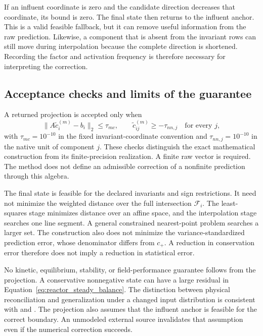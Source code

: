 If an influent coordinate is zero and the candidate direction decreases that coordinate, its bound is zero. The final state then returns to the influent anchor. This is a valid feasible fallback, but it can remove useful information from the raw prediction. Likewise, a component that is absent from the invariant rows can still move during interpolation because the complete direction is shortened. Recording the factor and activation frequency is therefore necessary for interpreting the correction.

\subsection{Acceptance checks and limits of the guarantee}

A returned projection is accepted only when
\begin{equation}
\|A\tilde c_i^{(m)}-b_i\|_2\leq\tau_{mc},\qquad
\tilde c_{ij}^{(m)}\geq-\tau_{nn,j}\quad\text{for every }j,
\label{eq:projection_numerical_acceptance}
\end{equation}
with $\tau_{mc}=10^{-10}$ in the fixed invariant-coordinate convention and $\tau_{nn,j}=10^{-10}$ in the native unit of component $j$. These checks distinguish the exact mathematical construction from its finite-precision realization. A finite raw vector is required. The method does not define an admissible correction of a nonfinite prediction through this algebra.

The final state is feasible for the declared invariants and sign restrictions. It need not minimize the weighted distance over the full intersection $\mathcal{F}_i$. The least-squares stage minimizes distance over an affine space, and the interpolation stage searches one line segment. A general constrained nearest-point problem searches a larger set. The construction also does not minimize the variance-standardized prediction error, whose denominator differs from $c_+$. A reduction in conservation error therefore does not imply a reduction in statistical error.

No kinetic, equilibrium, stability, or field-performance guarantee follows from the projection. A conservative nonnegative state can have a large residual in Equation~\eqref{eq:reactor_steady_balance}. The distinction between physical reconciliation and generalization under a changed input distribution is consistent with \citet{Shen2023} and \citet{Valente2025}. The projection also assumes that the influent anchor is feasible for the correct boundary. An unmodeled external source invalidates that assumption even if the numerical correction succeeds.

